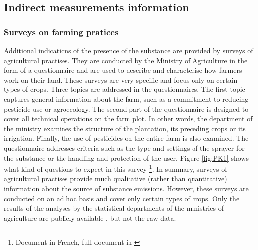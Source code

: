 
\subsection{Indirect measurements information}

\subsubsection{Surveys on farming pratices}

Additional indications of the presence of the substance are provided by surveys of agricultural practises. They are conducted by the Ministry of Agriculture in the form of a questionnaire and are used to describe and characterise how farmers work on their land. These surveys are very specific and focus only on certain types of crops. Three topics are addressed in the questionnaires. The first topic captures general information about the farm, such as a commitment to reducing pesticide use or agroecology. The second part of the questionnaire is designed to cover all technical operations on the farm plot. In other words, the department of the ministry examines the structure of the plantation, its preceding crops or its irrigation. Finally, the use of pesticides on the entire farm is also examined. The questionnaire addresses criteria such as the type and settings of the sprayer for the substance or the handling and protection of the user.
Figure \ref{fig:PK1} shows what kind of questions to expect in this survey \footnote{Document in French, full document in \cite{PK}}. In summary, surveys of agricultural practises provide much qualitative (rather than quantitative) information about the source of substance emissions. However, these surveys are conducted on an ad hoc basis and cover only certain types of crops. Only the results of the analyses by the statistical departments of the ministries of agriculture are publicly available \citep{PK2}, but not the raw data.

